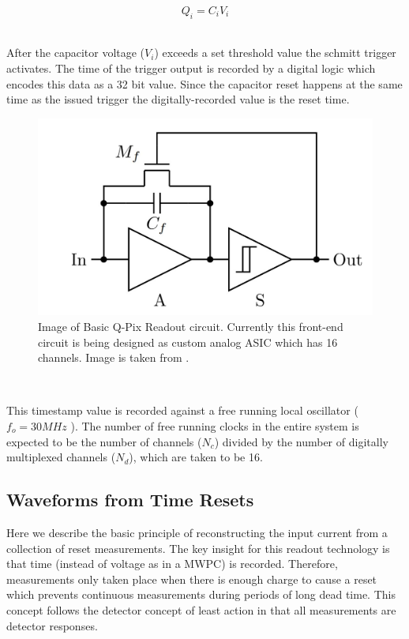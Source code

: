 
\begin{equation}
Q_{i} = C_{i}V_{i}
\end{equation}
~\label{eq:capacitor}

After the capacitor voltage ($V_{i}$) exceeds a set threshold value the schmitt trigger activates.
The time of the trigger output is recorded by a digital logic which encodes this data as a 32 bit value.
Since the capacitor reset happens at the same time as the issued trigger the digitally-recorded value is the reset time.

\begin{figure}[]
\centering
\includegraphics[width=\textwidth]{images/qpix_circuit.jpg}
\caption{Image of Basic Q-Pix Readout circuit. Currently this front-end circuit is being designed as custom analog ASIC which has 16 channels. Image is taken from \citep{qpix:nygren:mei}.}
\end{figure}
~\label{fig:qpixCircuit}

This timestamp value is recorded against a free running local oscillator ($f_{o} = 30\unit{MHz}$ ).
The number of free running clocks in the entire system is expected to be the number of channels ($N_{c}$) divided by the number of digitally multiplexed channels ($N_{d}$), which are taken to be 16.

\subsection{Waveforms from Time Resets}

Here we describe the basic principle of reconstructing the input current from a collection of reset measurements.
The key insight for this readout technology is that time (instead of voltage as in a MWPC) is recorded.
Therefore, measurements only taken place when there is enough charge to cause a reset which prevents continuous measurements during periods of long dead time.
This concept follows the detector concept of least action in that all measurements are detector responses.

